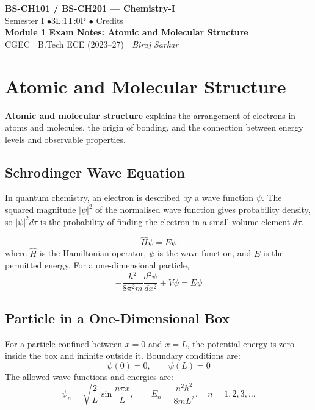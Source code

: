 \documentclass[12pt,a4paper]{article}
\begin{document}
\begin{center}
  {\LARGE\bfseries\color{myred} BS-CH101 / BS-CH201 --- Chemistry-I}\\[5pt]
  {\normalsize\color{mydark} Semester I \quad$\bullet$\quad 3L:1T:0P \quad$\bullet$ Credits}\\[3pt]
  {\normalsize\color{myteal}\textbf{Module 1 Exam Notes: Atomic and Molecular Structure}}\\[3pt]
  {\small\color{mydark} CGEC \;$|$\; B.Tech ECE (2023--27) \;$|$\; \textit{Biraj Sarkar}}
\end{center}
\vspace{2pt}
\noindent{\color{myred}\rule{\linewidth}{1.5pt}}
\vspace{2pt}

\hypersetup{linkcolor=mydark}
\tableofcontents
\hypersetup{linkcolor=myteal}
\newpage
\section{Atomic and Molecular Structure}

\begin{tcolorbox}[defbox]
\textbf{Atomic and molecular structure} explains the arrangement of electrons in atoms and molecules, the origin of bonding, and the connection between energy levels and observable properties.
\end{tcolorbox}

\subsection{Schrodinger Wave Equation}
In quantum chemistry, an electron is described by a wave function $\psi$. The squared magnitude $|\psi|^2$ of the normalised wave function gives probability density, so $|\psi|^2 d\tau$ is the probability of finding the electron in a small volume element $d\tau$.

\begin{tcolorbox}[formulabox, title={Time-Independent Schrodinger Equation}]
\[
\hat{H}\psi = E\psi
\]
where $\hat{H}$ is the Hamiltonian operator, $\psi$ is the wave function, and $E$ is the permitted energy. For a one-dimensional particle,
\[
-\frac{h^2}{8\pi^2m}\frac{d^2\psi}{dx^2}+V\psi=E\psi
\]
\end{tcolorbox}

\subsection{Particle in a One-Dimensional Box}
For a particle confined between $x=0$ and $x=L$, the potential energy is zero inside the box and infinite outside it. Boundary conditions are:
\[
\psi(0)=0,\qquad \psi(L)=0
\]
The allowed wave functions and energies are:
\[
\psi_n=\sqrt{\frac{2}{L}}\sin\frac{n\pi x}{L},\qquad E_n=\frac{n^2h^2}{8mL^2},\quad n=1,2,3,\ldots
\]
\end{document}
